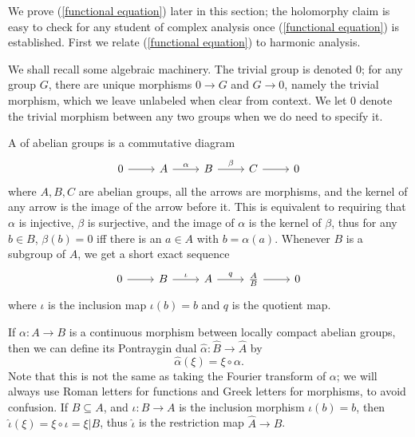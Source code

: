 We prove (\ref{functional equation}) later in this section; the holomorphy claim is easy to check for any student of complex analysis once (\ref{functional equation}) is established.
First we relate (\ref{functional equation}) to harmonic analysis.

We shall recall some algebraic machinery.
The trivial group is denoted $0$; for any group $G$, there are unique morphisms $0 \to G$ and $G \to 0$, namely the trivial morphism, which we leave unlabeled when clear from context.
We let $0$ denote the trivial morphism between any two groups when we do need to specify it.

A  of abelian groups is a commutative diagram
$$\begin{tikzcd}
0 \arrow[r] & A \arrow[r,"\alpha"] & B \arrow[r,"\beta"] & C \arrow[r] & 0
\end{tikzcd}$$
where $A,B,C$ are abelian groups, all the arrows are morphisms, and the kernel of any arrow is the image of the arrow before it.
This is equivalent to requiring that $\alpha$ is injective, $\beta$ is surjective, and the image of $\alpha$ is the kernel of $\beta$, thus for any $b \in B$, $\beta(b) = 0$ iff there is an $a \in A$ with $b = \alpha(a)$.
Whenever $B$ is a subgroup of $A$, we get a short exact sequence
\begin{equation}
\label{quotient SES}
\begin{tikzcd}
0 \arrow[r] & B \arrow[r,"\iota"] & A \arrow[r,"q"] & \frac{A}{B} \arrow[r] & 0
\end{tikzcd}
\end{equation}
where $\iota$ is the inclusion map $\iota(b) =b$ and $q$ is the quotient map.

If $\alpha: A \to B$ is a continuous morphism between locally compact abelian groups, then we can define its Pontraygin dual $\hat \alpha: \hat B \to \hat A$ by
\[\hat \alpha(\xi) = \xi \circ \alpha.\]
Note that this is not the same as taking the Fourier transform of $\alpha$; we will always use Roman letters for functions and Greek letters for morphisms, to avoid confusion.
If $B \subseteq A$, and $\iota: B \to A$ is the inclusion morphism $\iota(b) = b$, then $\hat \iota(\xi) = \xi \circ \iota = \xi|B$, thus $\hat \iota$ is the restriction map $\hat A \to \hat B$.

